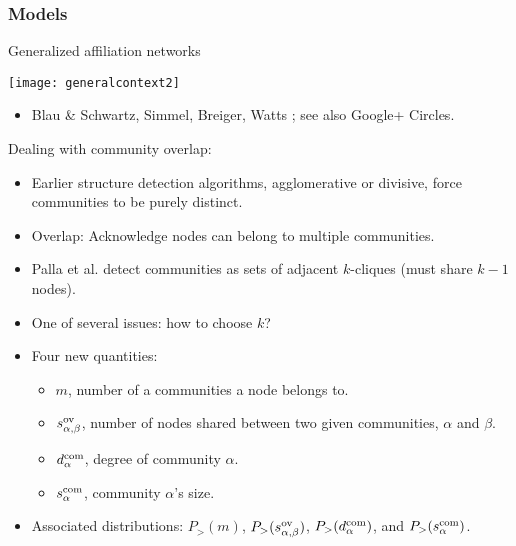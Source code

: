 \begin{frame}
  \frametitle{Models}

  \begin{block}{Generalized affiliation networks}

    \medskip

    \texttt{[image: generalcontext2]}  
    \begin{itemize}
    \item Blau \& Schwartz\cite{blau1984a}, Simmel\cite{simmel1902a},
      Breiger\cite{breiger1974a}, Watts \etal\cite{watts2002b}; 
      see also Google+ Circles.
    \end{itemize}
  \end{block}


\end{frame}



\begin{frame}

  \begin{block}{Dealing with community overlap:}
    \begin{itemize}
    \item<+->
      Earlier structure detection algorithms, agglomerative or divisive, force
      communities to be purely distinct.
    \item<+->
      Overlap: Acknowledge nodes can belong to multiple communities.
    \item<+->
      Palla et al.\cite{palla2005a} detect communities as sets of adjacent
      $k$-cliques (must share $k-1$ nodes).
    \item<+->
      One of several issues: how to choose $k$?
    \item<+->
      Four new quantities:
      \begin{itemize}
      \item<+->
        $m$, number of a communities a node belongs to.
      \item<+->
        $s_{\alpha,\beta}^{\textnormal{ov}}$, number of nodes 
        shared between
        two given communities, $\alpha$ and $\beta$.
      \item<+->
        $d_{\alpha}^{\textnormal{com}}$, degree of community $\alpha$.
      \item<+->
        $s_{\alpha}^{\textnormal{com}}$, community $\alpha$'s size.
      \end{itemize}
    \item<+->
      Associated distributions:\newline
      $P_{>}(m)$,
      $P_{>}(s_{\alpha,\beta}^{\textnormal{ov}})$,
      $P_{>}(d_{\alpha}^{\textnormal{com}})$,
      and
      $P_{>}(s_{\alpha}^{\textnormal{com}})$.
    \end{itemize}
  \end{block}

\end{frame}


